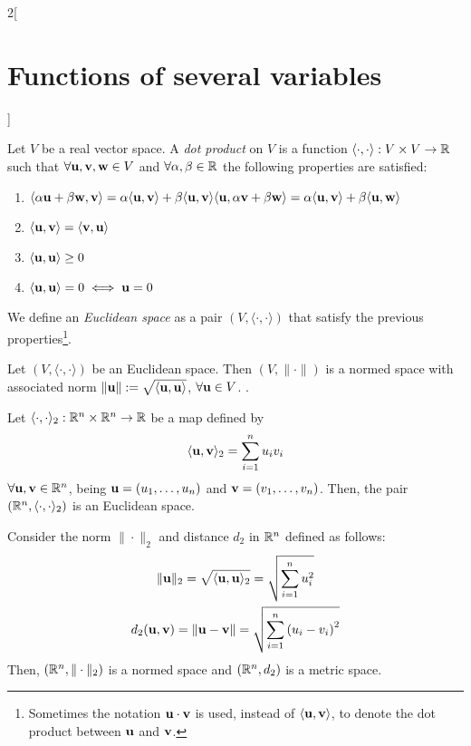\documentclass[../../../main_math.tex]{subfiles}
\begin{document}
\begin{multicols}{2}[\section{Functions of several variables}]
\begin{definition}
    Let $V$ be a real vector space. A \emph{dot product} on $V$ is a function $\langle\cdot,\cdot\rangle:V\times V\rightarrow\mathbb{R} $ such that $\forall \boldsymbol{\mathrm{u}},\boldsymbol{\mathrm{v}},\boldsymbol{\mathrm{w}}\in V$ and $\forall\alpha,\beta\in\mathbb{R} $ the following properties are satisfied:
    \begin{enumerate}
      \item $\langle \alpha \boldsymbol{\mathrm{u}}+\beta \boldsymbol{\mathrm{w}},\boldsymbol{\mathrm{v}}\rangle=\alpha\langle \boldsymbol{\mathrm{u}},\boldsymbol{\mathrm{v}}\rangle+\beta\langle \boldsymbol{\mathrm{u}},\boldsymbol{\mathrm{v}}\rangle\\\langle \boldsymbol{\mathrm{u}},\alpha \boldsymbol{\mathrm{v}}+\beta \boldsymbol{\mathrm{w}}\rangle=\alpha\langle \boldsymbol{\mathrm{u}},\boldsymbol{\mathrm{v}}\rangle+\beta\langle \boldsymbol{\mathrm{u}},\boldsymbol{\mathrm{w}}\rangle$
      \item $\langle \boldsymbol{\mathrm{u}},\boldsymbol{\mathrm{v}}\rangle=\langle \boldsymbol{\mathrm{v}},\boldsymbol{\mathrm{u}}\rangle$
      \item $\langle \boldsymbol{\mathrm{u}},\boldsymbol{\mathrm{u}}\rangle\geq 0$
      \item $\langle \boldsymbol{\mathrm{u}},\boldsymbol{\mathrm{u}}\rangle=0\iff \boldsymbol{\mathrm{u}}=0$
    \end{enumerate}
    We define an \emph{Euclidean space} as a pair $(V,\langle\cdot,\cdot\rangle)$ that satisfy the previous properties\footnote{Sometimes the notation $\boldsymbol{\mathrm{u}}\cdot \boldsymbol{\mathrm{v}}$ is used, instead of $\langle \boldsymbol{\mathrm{u}},\boldsymbol{\mathrm{v}}\rangle$, to denote the dot product between $\boldsymbol{\mathrm{u}}$ and $\boldsymbol{\mathrm{v}}$.}.
  \end{definition}
  \begin{proposition}
    Let $(V,\langle\cdot,\cdot\rangle)$ be an Euclidean space. Then $(V,\|\cdot\|)$ is a normed space with associated norm $\|\boldsymbol{\mathrm{u}}\|:=\sqrt{\langle \boldsymbol{\mathrm{u}},\boldsymbol{\mathrm{u}}\rangle}$, $\forall \boldsymbol{\mathrm{u}}\in V$. .
  \end{proposition}
  \begin{proposition}
    Let $\langle\cdot,\cdot\rangle_2:\mathbb{R}^n\times\mathbb{R}^n\rightarrow\mathbb{R} $ be a map defined by $$\langle \boldsymbol{\mathrm{u}},\boldsymbol{\mathrm{v}}\rangle_2=\sum_{i=1}^nu_iv_i$$ $\forall \boldsymbol{\mathrm{u}},\boldsymbol{\mathrm{v}}\in \mathbb{R}^n$, being $\boldsymbol{\mathrm{u}}=(u_1,\ldots,u_n)$ and $\boldsymbol{\mathrm{v}}=(v_1,\ldots,v_n)$. Then, the pair $(\mathbb{R}^n,\langle\cdot,\cdot\rangle_2)$ is an Euclidean space.
  \end{proposition}
  \begin{corollary}
    Consider the norm $\|\cdot\|_2$ and distance $d_2$ in $\mathbb{R}^n$ defined as follows:
    \begin{gather*}
      \|\boldsymbol{\mathrm{u}}\|_2=\sqrt{\langle \boldsymbol{\mathrm{u}},\boldsymbol{\mathrm{u}}\rangle_2}=\sqrt{\sum_{i=1}^nu_i^2}\\
      d_2(\boldsymbol{\mathrm{u}},\boldsymbol{\mathrm{v}})=\|\boldsymbol{\mathrm{u}}-\boldsymbol{\mathrm{v}}\|=\sqrt{\sum_{i=1}^n{(u_i-v_i)}^2}
    \end{gather*}
    Then, $(\mathbb{R}^n,\|\cdot\|_2)$ is a normed space and $(\mathbb{R}^n,d_2)$ is a metric space.

\end{corollary}
\end{multicols}
\end{document}
